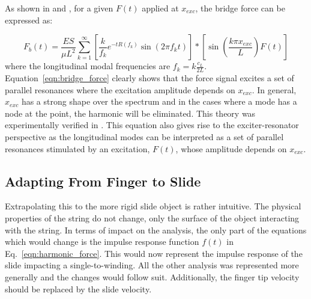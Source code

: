 \documentclass[main.tex]{subfiles}
\begin{document}
As shown in  and , for a given $F(t)$ applied at $x_{exc}$, the bridge force can be expressed as:

\begin{equation}
    F_b(t) = \frac{ES}{\mu L^2} \sum_{k = 1}^{\infty} \left[\frac{k}{f_k} e^{-t R(f_k)} \sin(2\pi f_k t)\right] \ast \left[ \sin\left(\frac{k \pi x_{exc}}{L}\right) F(t)\right]
    \label{eqn:bridge_force}
\end{equation}
where the longitudinal modal frequencies are $f_k = k \frac{c_L}{2L}$. Equation~\ref{eqn:bridge_force} clearly shows that the force signal excites a set of parallel resonances where the excitation amplitude depends on $x_{exc}$. In general, $x_{exc}$ has a strong shape over the spectrum and in the cases where a mode has a node at the point, the harmonic will be eliminated. This theory was experimentally verified in . This equation also gives rise to the exciter-resonator perspective as the longitudinal modes can be interpreted as a set of parallel resonances stimulated by an excitation, $F(t)$, whose amplitude depends on $x_{exc}$.

\subsection{Adapting From Finger to Slide}
Extrapolating this to the more rigid slide object is rather intuitive. The physical properties of the string do not change, only the surface of the object interacting with the string. In terms of impact on the analysis, the only part of the equations which would change is the impulse response function $f(t)$ in Eq.~\ref{eqn:harmonic_force}. This would now represent the impulse response of the slide impacting a single-to-winding. All the other analysis was represented more generally and the changes would follow suit. Additionally, the finger tip velocity should be replaced by the slide velocity.
\end{document}
